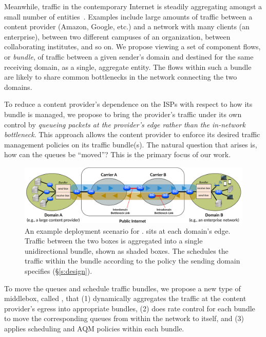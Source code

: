 Meanwhile, traffic in the contemporary Internet is steadily aggregating amongst a small number of entities~\cite{fivecomps}. 
Examples include large amounts of traffic between a content provider (\eg Amazon, Google, etc.) and a network with many clients (\eg an enterprise), between two different campuses of an organization, between collaborating institutes, and so on.
We propose viewing a set of component flows, or \emph{bundle}, of traffic between a given sender's domain and destined for the same receiving domain, as a single, aggregate entity.
The flows within such a bundle are likely to share common bottlenecks in the network connecting the two domains.

To reduce a content provider's dependence on the ISPs with respect to how its bundle is managed, we propose to bring the provider's traffic under its own control by \emph{queueing packets at the provider's edge rather than the in-network bottleneck}.
This approach allows the content provider to enforce its desired traffic management policies on its traffic bundle(s).
The natural question that arises is, how can the queues be ``moved''? This is the primary focus of our work. 

\begin{figure}[t]
    \centering
    \includegraphics[width=\textwidth]{img/deployment-arch.pdf}
    \caption{An example deployment scenario for \name. 
    \name sits at each domain's edge. Traffic between the two boxes is aggregated into a single unidirectional bundle, shown as shaded boxes. The \inbox schedules the traffic within the bundle according to the policy the sending domain specifies (\S\ref{s:design}).
    }\label{fig:deploy:arch}
\end{figure}

To move the queues and schedule traffic bundles, we propose a new type of middlebox, called \name, that (1) dynamically aggregates the traffic at the content provider's egress into appropriate bundles, (2) does rate control for each bundle to move the corresponding queues from within the network to itself, and (3) applies scheduling and AQM policies within each bundle. 


